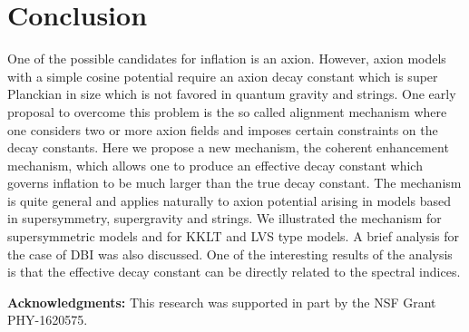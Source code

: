 \documentclass[12pt]{article}
\begin{document}

\section{Conclusion \label{sec:Conclusion}}
One of the possible candidates for inflation is an axion.
However, axion models with a simple cosine potential require an axion decay constant which is super Planckian in size which is not favored in quantum gravity and strings.
One early proposal to overcome this problem is the so called alignment mechanism where one considers two or more axion fields and imposes certain constraints on the decay constants.
Here we propose a new mechanism, the coherent enhancement mechanism, which allows one to produce an effective decay constant which governs inflation to be much larger than the true decay constant.
The mechanism is quite general and applies naturally to axion potential arising in models based in supersymmetry, supergravity and strings.
We illustrated the mechanism for supersymmetric models and for KKLT and LVS type models.
A brief analysis for the case of DBI was also discussed.
One of the interesting results of the analysis is that the effective decay constant can be directly related to the spectral indices.

\textbf{Acknowledgments:}
This research was supported in part by the NSF Grant PHY-1620575.

\clearpage
\end{document}

